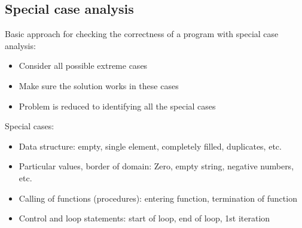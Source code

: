 \subsection{Special case analysis}
Basic approach for checking the correctness of a program with special case analysis:
\begin{itemize}
    \item Consider all possible extreme cases
    \item Make sure the solution works in these cases
    \item Problem is reduced to identifying all the special cases 
\end{itemize}

Special cases:
\begin{itemize}
    \item Data structure: empty, single element, completely filled, duplicates, etc.
    \item Particular values, border of domain: Zero, empty string, negative numbers, etc.
    \item Calling of functions (procedures): entering function, termination of function
    \item Control and loop statements: start of loop, end of loop, 1st iteration
\end{itemize}